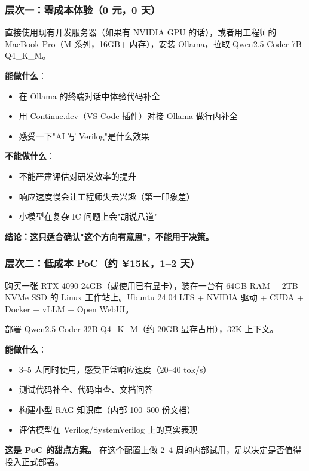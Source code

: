 \documentclass[UTF8,a4paper,10pt,oneside]{ctexart}
\begin{document}
\subsubsection{层次一：零成本体验（0 元，0 天）}

直接使用现有开发服务器（如果有 NVIDIA GPU 的话），或者用工程师的 MacBook Pro（M 系列，16GB+ 内存），安装 Ollama，拉取 Qwen2.5-Coder-7B-Q4\_K\_M。

\textbf{能做什么}：
\begin{itemize}
    \item 在 Ollama 的终端对话中体验代码补全
    \item 用 Continue.dev（VS Code 插件）对接 Ollama 做行内补全
    \item 感受一下"AI 写 Verilog"是什么效果
\end{itemize}

\textbf{不能做什么}：
\begin{itemize}
    \item 不能严肃评估对研发效率的提升
    \item 响应速度慢会让工程师失去兴趣（第一印象差）
    \item 小模型在复杂 IC 问题上会"胡说八道"
\end{itemize}

\textbf{结论：这只适合确认"这个方向有意思"，不能用于决策。}

\subsubsection{层次二：低成本 PoC（约 ¥15K，1--2 天）}

购买一张 RTX 4090 24GB（或使用已有显卡），装在一台有 64GB RAM + 2TB NVMe SSD 的 Linux 工作站上。Ubuntu 24.04 LTS + NVIDIA 驱动 + CUDA + Docker + vLLM + Open WebUI。

部署 Qwen2.5-Coder-32B-Q4\_K\_M（约 20GB 显存占用），32K 上下文。

\textbf{能做什么}：
\begin{itemize}
    \item 3--5 人同时使用，感受正常响应速度（20--40 tok/s）
    \item 测试代码补全、代码审查、文档问答
    \item 构建小型 RAG 知识库（内部 100--500 份文档）
    \item 评估模型在 Verilog/SystemVerilog 上的真实表现
\end{itemize}

\textbf{这是 PoC 的甜点方案。} 在这个配置上做 2--4 周的内部试用，足以决定是否值得投入正式部署。
\end{document}
